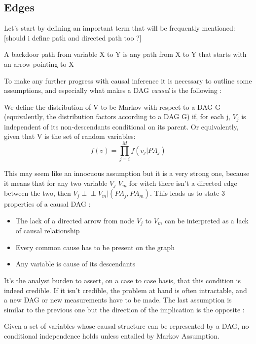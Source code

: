 \subsection{Edges}
Let's start by defining an important term that will be frequently mentioned:
[should i define path and directed path too ?]
\begin{definition}
A backdoor path from variable X to Y is any path from X to Y that starts with an arrow pointing to X
\end{definition}
To make any further progress with causal inference it is necessary to outline some assumptions, and especially what makes a DAG \textit{causal} is the following \citep{hernan2020causal}: 
\begin{ass}
We define the distribution of V to be Markov with respect to a DAG G (equivalently, the distribution factors according to a DAG G) if, for each j, $V_j$ is independent of its non-descendants conditional on its parent.
Or equivalently, given that V is the set of random variables:
\begin{equation}
f(v) = \prod_{j=i}^M f(v_j|PA_j) 
\end{equation}
\end{ass}
\label{ass:Markov}
This may seem like an innocuous assumption but it is a very strong one, because it means that for any two variable $V_j$ $V_m$ for witch there isn't a directed edge between the two, then $V_j \perp\!\!\!\perp V_m | (PA_j, PA_m)$. This leads us to state 3 properties of a causal DAG \citep{hernan2020causal}:
\begin{itemize}
\item The lack of a directed arrow from node $V_j$ to $V_m$ can be interpreted as a lack of causal relationship 
\item Every common cause has to be present on the graph 
\item Any variable is cause of its descendants 
\end{itemize}
It's the analyst burden to assert, on a case to case basis, that this condition is indeed credible. If it isn't credible, the problem at hand is often intractable, and a new DAG or new measurements have to be made.
The last assumption is similar to the previous one but the direction of the implication is the opposite  \citep{ramsey2012adjacency}: 
\begin{ass}[Faithfulness]
Given a set of variables whose causal structure can be represented by a
DAG, no conditional independence holds unless entailed by Markov Assumption.
\end{ass}
